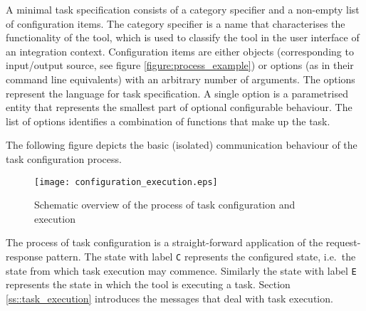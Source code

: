 \documentclass{article}
\begin{document}
   A minimal task specification consists of a category specifier and a
   non-empty list of configuration items. The category specifier is a name that
   characterises the functionality of the tool, which is used to classify the
   tool in the user interface of an integration context. Configuration items
   are either objects (corresponding to input/output source, see figure
   \ref{figure:process_example}) or options (as in their command line
   equivalents) with an arbitrary number of arguments.  The options represent
   the language for task specification. A single option is a parametrised
   entity that represents the smallest part of optional configurable behaviour.
   The list of options identifies a combination of functions that make up the
   task. 



   The following figure depicts the basic (isolated) communication behaviour of
   the task configuration process.
   
   \begin{figure}[H]
    \begin{center}
     \texttt{[image: configuration\_execution.eps]}
    \end{center}
    \vspace{-0.3cm}
    \label{fig:configuration_execution}
    \caption{Schematic overview of the process of task configuration and execution}
   \end{figure}

   \noindent The process of task configuration is a straight-forward application of the
   request-response pattern. The state with label \texttt{C} represents the
   configured state, i.e.\ the state from which task execution may commence.
   Similarly the state with label \texttt{E} represents the state in which the
   tool is executing a task. Section \ref{ss::task_execution} introduces the
   messages that deal with task execution.
\end{document}
